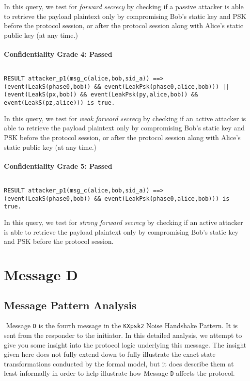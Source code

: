 In this query, we test for \emph{forward secrecy} by checking if a passive attacker is able to retrieve the payload plaintext only by compromising Bob's static key and PSK before the protocol session, or after the protocol session along with Alice's static public key (at any time.)


\paragraph{Confidentiality Grade 4: Passed}$ $
\begin{lstlisting}
RESULT attacker_p1(msg_c(alice,bob,sid_a)) ==> (event(LeakS(phase0,bob)) && event(LeakPsk(phase0,alice,bob))) || (event(LeakS(px,bob)) && event(LeakPsk(py,alice,bob)) && event(LeakS(pz,alice))) is true.
\end{lstlisting}

In this query, we test for \emph{weak forward secrecy} by checking if an active attacker is able to retrieve the payload plaintext only by compromising Bob's static key and PSK before the protocol session, or after the protocol session along with Alice's static public key (at any time.)


\paragraph{Confidentiality Grade 5: Passed}$ $
\begin{lstlisting}
RESULT attacker_p1(msg_c(alice,bob,sid_a)) ==> (event(LeakS(phase0,bob)) && event(LeakPsk(phase0,alice,bob))) is true.
\end{lstlisting}

In this query, we test for \emph{strong forward secrecy} by checking if an active attacker is able to retrieve the payload plaintext only by compromising Bob's static key and PSK before the protocol session.


\section{ Message D}

\subsection{Message Pattern Analysis}$ $
Message \texttt{D} is the fourth message in the \texttt{KXpsk2} Noise Handshake Pattern. It is sent from the responder to the initiator. In this detailed analysis, we attempt to give you some insight into the protocol logic underlying this message. The insight given here does not fully extend down to fully illustrate the exact state transformations conducted by the formal model, but it does describe them at least informally in order to help illustrate how Message \texttt{D} affects the protocol.


